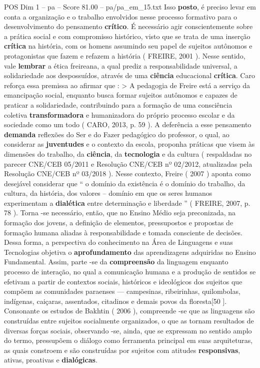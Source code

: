 \begin{textsample}{POS Dim 1 – pa – Score 81.00 – pa/pa\_em\_15.txt}
Isso \textbf{posto}, é preciso levar em conta a organização e o trabalho envolvidos nesse processo formativo para o desenvolvimento do pensamento \textbf{crítico}.
É necessário agir conscientemente sobre a prática social e com compromisso histórico, visto que se trata de uma inserção \textbf{crítica} na história, com os homens assumindo seu papel de sujeitos autônomos e protagonistas que fazem e refazem a história ( FREIRE, 2001 ).
Nesse sentido, vale \textbf{lembrar} a ética freireana, a qual prediz a responsabilidade universal, a solidariedade aos despossuídos, através de uma \textbf{ciência} educacional \textbf{crítica}.
Caro reforça essa premissa ao afirmar que : > A pedagogia de Freire está a serviço da emancipação social, enquanto busca formar sujeitos autônomos e capazes de praticar a solidariedade, contribuindo para a formação de uma consciência coletiva \textbf{transformadora} e humanizadora do próprio processo escolar e da sociedade como um todo ( CARO, 2013, p. 59 ).
A deferência a esse pensamento \textbf{demanda} reflexões do Ser e do Fazer pedagógico do professor, o qual, ao considerar as \textbf{juventudes} e o contexto da escola, proponha práticas que visem às dimensões do trabalho, da \textbf{ciência}, da \textbf{tecnologia} e da cultura ( respaldadas no parecer CNE/CEB 05/2011 e Resolução CNE/CEB nº 02/2012, atualizadas pela Resolução CNE/CEB nº 03/2018 ).
Nesse contexto, Freire ( 2007 ) aponta como desejável considerar que “ o domínio da existência é o domínio do trabalho, da cultura, da história, dos valores – domínio em que os seres humanos experimentam a \textbf{dialética} entre determinação e liberdade ” ( FREIRE, 2007, p. 78 ).
Torna -se necessário, então, que no Ensino Médio seja preconizada, na formação dos jovens, a definição de elementos, pressupostos e propostas de formação humana aliadas à responsabilidade e tomada consciente de decisões.
Dessa forma, a perspectiva do conhecimento na Área de Linguagens e suas Tecnologias objetiva o \textbf{aprofundamento} das aprendizagens adquiridas no Ensino Fundamental.
Assim, parte -se da \textbf{compreensão} da linguagem enquanto processo de interação, no qual a comunicação humana e a produção de sentidos se efetivam a partir de contextos sociais, históricos e ideológicos dos sujeitos que compõem as comunidades paraenses — campesinas, ribeirinhas, quilombolas, indígenas, caiçaras, assentados, citadinos e demais povos da floresta[50 ].
Consonante os estudos de Bakhtin ( 2006 ), compreende -se que as linguagens são construídas entre sujeitos socialmente organizados, o que as tornam resultados de diversas forças sociais, observando -se, ainda, que se expressam no sentido amplo do termo, pressupõem o diálogo como ferramenta principal em suas arquiteturas, as quais constroem e são construídas por sujeitos com atitudes \textbf{responsivas}, ativas, proativas e \textbf{dialógicas}.

\end{textsample}
